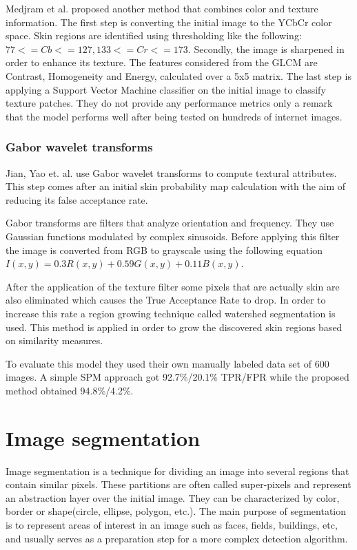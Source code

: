 \documentclass[12pt]{report}
\begin{document}
 	Medjram et al.\cite{texture_svm} proposed another method that combines color and texture information. The first step is converting the initial image to the YCbCr color space. Skin regions are identified using thresholding like the following: \(77 <= Cb <= 127, 133 <= Cr <= 173\). Secondly, the image is sharpened in order to enhance its texture. The features considered from the GLCM are Contrast, Homogeneity and Energy, calculated over a 5x5 matrix. The last step is applying a Support Vector Machine classifier on the initial image to classify texture patches. They do not provide any performance metrics only a remark that the model performs well after being tested on hundreds of internet images.
 	
 	\subsubsection{Gabor wavelet transforms}
 	Jian, Yao et. al. \cite{texture_gabor_wavelet} use Gabor wavelet transforms to compute textural attributes. This step comes after an initial skin probability map calculation with the aim of reducing its false acceptance rate. 
 	
 	Gabor transforms are filters that analyze orientation and frequency. They use Gaussian functions modulated by complex sinusoids. Before applying this filter the image is converted from RGB to grayscale using the following equation $I(x,y)=0.3R(x,y)+0.59G(x,y)+0.11B(x,y)$.
 	
 	After the application of the texture filter some pixels that are actually skin are also eliminated which causes the True Acceptance Rate to drop. In order to increase this rate a region growing technique called watershed segmentation is used. This method is applied in order to grow the discovered skin regions based on similarity measures.
 	
 	To evaluate this model they used their own manually labeled data set of 600 images. A simple SPM approach got 92.7\%/20.1\% TPR/FPR while the proposed method obtained 94.8\%/4.2\%.
 	
	\section{Image segmentation}
	Image segmentation is a technique for dividing an image into several regions that contain similar pixels. These partitions are often called super-pixels and represent an abstraction layer over the initial image. They can be characterized by color, border or shape(circle, ellipse, polygon, etc.)\cite{computer_vision_book}. The main purpose of segmentation is to represent areas of interest in an image such as faces, fields, buildings, etc, and usually serves as a preparation step for a more complex detection algorithm.
	
\end{document}
